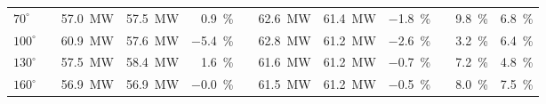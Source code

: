 \documentclass[conf]{new-aiaa}
\begin{document}
\begin{table}[htpb!]
\begin{tabular}{@{}lcrrrcrrrcrr@{}}
\multicolumn{1}{l}{$70^{\circ}$} & & \SI[per-mode=symbol]{57.0}{\mega\watt} &\SI[per-mode=symbol]{57.5}{\mega\watt} &\SI[per-mode=symbol]{0.9}{\percent} & &\SI[per-mode=symbol]{62.6}{\mega\watt} &\SI[per-mode=symbol]{61.4}{\mega\watt} &\SI[per-mode=symbol]{-1.8}{\percent} & &\SI[per-mode=symbol]{9.8}{\percent} &\SI[per-mode=symbol]{6.8}{\percent} \\


\multicolumn{1}{l}{$100^{\circ}$} & & \SI[per-mode=symbol]{60.9}{\mega\watt} &\SI[per-mode=symbol]{57.6}{\mega\watt} &\SI[per-mode=symbol]{-5.4}{\percent} & &\SI[per-mode=symbol]{62.8}{\mega\watt} &\SI[per-mode=symbol]{61.2}{\mega\watt} &\SI[per-mode=symbol]{-2.6}{\percent} & &\SI[per-mode=symbol]{3.2}{\percent} &\SI[per-mode=symbol]{6.4}{\percent} \\


\multicolumn{1}{l}{$130^{\circ}$} & & \SI[per-mode=symbol]{57.5}{\mega\watt} &\SI[per-mode=symbol]{58.4}{\mega\watt} &\SI[per-mode=symbol]{1.6}{\percent} & &\SI[per-mode=symbol]{61.6}{\mega\watt} &\SI[per-mode=symbol]{61.2}{\mega\watt} &\SI[per-mode=symbol]{-0.7}{\percent} & &\SI[per-mode=symbol]{7.2}{\percent} &\SI[per-mode=symbol]{4.8}{\percent} \\


\multicolumn{1}{l}{$160^{\circ}$} & & \SI[per-mode=symbol]{56.9}{\mega\watt} &\SI[per-mode=symbol]{56.9}{\mega\watt} &\SI[per-mode=symbol]{-0.0}{\percent} & &\SI[per-mode=symbol]{61.5}{\mega\watt} &\SI[per-mode=symbol]{61.2}{\mega\watt} &\SI[per-mode=symbol]{-0.5}{\percent} & &\SI[per-mode=symbol]{8.0}{\percent} &\SI[per-mode=symbol]{7.5}{\percent} \\


\end{tabular}
\end{table}
\end{document}

